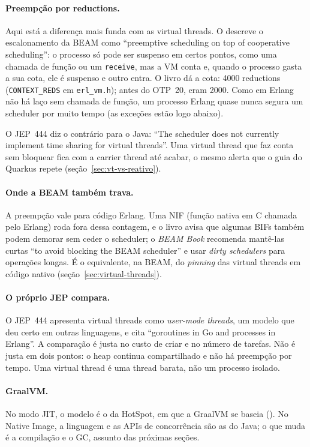 \paragraph{Preempção por reductions.}
Aqui está a diferença mais funda com as virtual threads. O
 descreve o escalonamento da BEAM como
\enquote{preemptive scheduling on top of cooperative scheduling}: o
processo só pode ser suspenso em certos pontos, como uma chamada de
função ou um \texttt{receive}, mas a VM conta
 e, quando o processo gasta a
sua cota, ele é suspenso e outro entra. O livro dá a cota: 4000
reductions (\texttt{CONTEXT\_REDS} em \texttt{erl\_vm.h}); antes do
OTP~20, eram 2000. Como em Erlang não há laço sem chamada de função, um
processo Erlang quase nunca segura um scheduler por muito tempo (as
exceções estão logo abaixo).

O JEP~444 diz o contrário para o Java: \enquote{The scheduler does not
currently implement time sharing for virtual threads}. Uma virtual
thread que faz conta sem bloquear fica com a carrier thread até acabar,
o mesmo alerta que o guia do Quarkus repete
(seção~\ref{sec:vt-vs-reativo}).

\paragraph{Onde a BEAM também trava.}
A preempção vale para código Erlang. Uma NIF (função nativa em C chamada
pelo Erlang) roda fora dessa contagem, e o livro avisa que algumas BIFs
também podem demorar sem ceder o scheduler; o \emph{BEAM Book} recomenda
mantê-las curtas \enquote{to avoid blocking the BEAM scheduler} e usar
\emph{dirty schedulers} para operações longas. É o equivalente, na BEAM,
do \emph{pinning} das virtual threads em código nativo
(seção~\ref{sec:virtual-threads}).

\paragraph{O próprio JEP compara.}
O JEP~444 apresenta virtual threads como \emph{user-mode threads}, um
modelo que deu certo em outras linguagens, e cita \enquote{goroutines in
Go and processes in Erlang}. A comparação é justa no custo de criar e
no número de tarefas. Não é justa em dois pontos: o heap continua
compartilhado e não há preempção por tempo. Uma virtual thread é uma
thread barata, não um processo isolado.

\paragraph{GraalVM.}
No modo JIT, o modelo é o da HotSpot, em que a GraalVM se baseia
(). No Native Image, a linguagem e as APIs de
concorrência são as do Java; o que muda é a compilação e o GC, assunto
das próximas seções.
